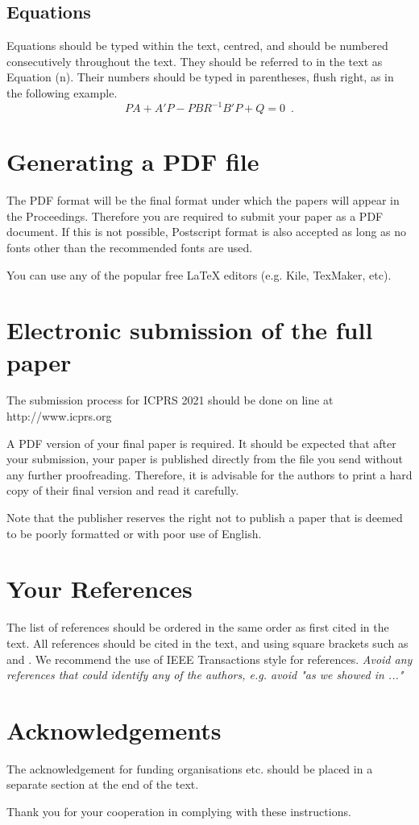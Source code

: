 \documentclass[10pt,twocolumn]{article}
\begin{document}
\subsection{Equations}
Equations should be typed within the text, centred, and should
be numbered consecutively throughout the text. They should
be referred to in the text as Equation (n). Their numbers
should be typed in parentheses, flush right, as in the following
example.
\begin{equation}
	    PA + A'P - PBR^{-1}B'P + Q  =  0 \enspace.
\end{equation}

\section{Generating a {PDF} file}
The PDF format will be the final format under which the
papers will appear in the Proceedings. Therefore you are
required to submit your paper as a PDF document. If this is not
possible, Postscript format is also accepted as long as no fonts
other than the recommended fonts are used.

You can use any of the popular free LaTeX editors (e.g. Kile, TexMaker, etc).

\section{Electronic submission of the full paper}
The submission process for ICPRS 2021 should be done on
line at http://www.icprs.org

A PDF version of your final paper is required. It should
be expected that after your submission, your paper is
published directly from the file you send without any further
proofreading. Therefore, it is advisable for the authors to
print a hard copy of their final version and read it carefully.

Note that the publisher reserves the right not to publish a paper that is deemed to be poorly formatted or with poor use of English.

\section{Your References}
The list of references should be ordered in the same order as
first cited in the text. All references should be cited in the
text, and using square brackets such as \cite{ref01} and \cite{ref01,ref02}. We
recommend the use of IEEE Transactions style for references. \textit{Avoid any references
that could identify any of the authors, e.g. avoid "as we showed in ..."}

\section*{Acknowledgements}
The acknowledgement for funding organisations etc. should
be placed in a separate section at the end of the text.



Thank you for your cooperation in complying with these
instructions.



\end{document}
